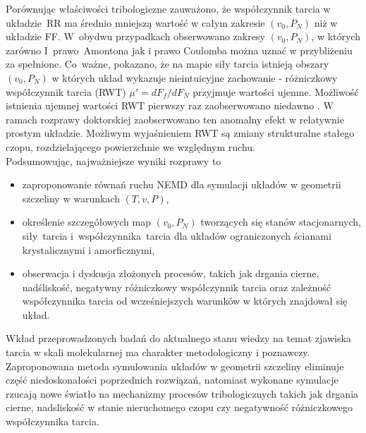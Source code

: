 \documentclass[12pt,a4paper,openright]{report} %
\begin{document}
Porównując właściwości tribologiczne zauważono, że współczynnik tarcia w układzie~RR ma średnio mniejszą wartość w całym zakresie $(v_0, P_N)$ niż w układzie FF. W~obydwu przypadkach obserwowano zakresy $(v_0, P_N)$, w których zarówno I~prawo~Amontona jak i prawo Coulomba można uznać w przybliżeniu za spełnione. Co~ważne, pokazano, że na mapie siły tarcia istnieją obszary $(v_0 ,P_N)$ w których układ wykazuje nieintuicyjne zachowanie - różniczkowy współczynnik tarcia (RWT) $\mu' = {d F_f}/{d F_N}$ przyjmuje wartości ujemne. 
%
Możliwość istnienia ujemnej wartości RWT pierwszy raz zaobserwowano niedawno \cite{Deng2012}.
%
W ramach rozprawy doktorskiej zaobserwowano ten anomalny efekt w relatywnie prostym układzie. Możliwym wyjaśnieniem RWT są zmiany strukturalne stałego czopu, rozdzielającego powierzchnie we względnym ruchu. \\
Podsumowując, najważniejsze wyniki rozprawy to
\begin{itemize}
\item zaproponowanie równań ruchu NEMD dla symulacji układów w geometrii szczeliny w warunkach $(T, v, P)$,
\item określenie szczegółowych map $(v_0, P_N)$ tworzących się stanów stacjonarnych, \linebreak siły~tarcia i~współczynnika~tarcia dla układów ograniczonych ścianami krystalicznymi i amorficznymi,
\item obserwacja i dyskusja złożonych procesów, takich jak drgania cierne, nadśliskość, negatywny różniczkowy współczynnik tarcia oraz zależność współczynnika tarcia od wcześniejszych warunków w których znajdował się układ. 
\end{itemize} 

Wkład przeprowadzonych badań do aktualnego stanu wiedzy na temat zjawiska tarcia w skali molekularnej ma charakter metodologiczny i poznawczy. Zaproponowana metoda symulowania układów w geometrii szczeliny eliminuje część niedoskonałości poprzednich rozwiązań, natomiast wykonane symulacje rzucają nowe światło na mechanizmy procesów tribologicznych takich jak drgania cierne, nadsliskość w stanie nieruchomego czopu czy negatywność różniczkowego współczynnika tarcia. 
%
\appendix
\end{document}
